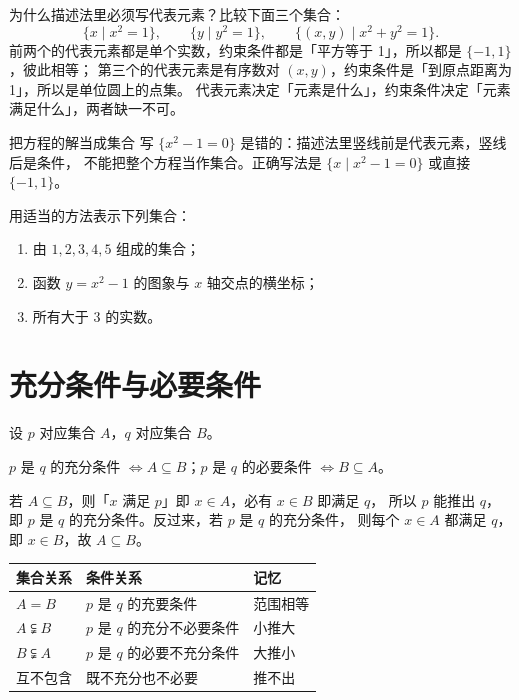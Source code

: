 \begin{derivation}
为什么描述法里必须写代表元素？比较下面三个集合：
\[
  \{x\mid x^2=1\},\qquad \{y\mid y^2=1\},\qquad \{(x,y)\mid x^2+y^2=1\}.
\]
前两个的代表元素都是单个实数，约束条件都是「平方等于 1」，所以都是 $\{-1,1\}$，彼此相等；
第三个的代表元素是有序数对 $(x,y)$，约束条件是「到原点距离为 1」，所以是单位圆上的点集。
代表元素决定「元素是什么」，约束条件决定「元素满足什么」，两者缺一不可。
\end{derivation}

\begin{commonerror}{把方程的解当成集合}
写 $\{x^2-1=0\}$ 是错的：描述法里竖线前是代表元素，竖线后是条件，
不能把整个方程当作集合。正确写法是 $\{x\mid x^2-1=0\}$ 或直接 $\{-1,1\}$。
\end{commonerror}

\begin{exercise}
用适当的方法表示下列集合：
\begin{enumerate}
  \item 由 $1,2,3,4,5$ 组成的集合；
  \item 函数 $y=x^2-1$ 的图象与 $x$ 轴交点的横坐标；
  \item 所有大于 $3$ 的实数。
\end{enumerate}
\end{exercise}

\section{充分条件与必要条件}

设 $p$ 对应集合 $A$，$q$ 对应集合 $B$。

\begin{theorem}
$p$ 是 $q$ 的充分条件 $\iff A\subseteq B$；$p$ 是 $q$ 的必要条件 $\iff B\subseteq A$。
\end{theorem}

\begin{derivation}
若 $A\subseteq B$，则「$x$ 满足 $p$」即 $x\in A$，必有 $x\in B$ 即满足 $q$，
所以 $p$ 能推出 $q$，即 $p$ 是 $q$ 的充分条件。反过来，若 $p$ 是 $q$ 的充分条件，
则每个 $x\in A$ 都满足 $q$，即 $x\in B$，故 $A\subseteq B$。
\end{derivation}

\begin{center}
\footnotesize
\setlength{\tabcolsep}{3pt}
\renewcommand{\arraystretch}{1.4}
\begin{tabular}{p{3.4cm}p{4.6cm}p{3.4cm}}
\toprule
集合关系 & 条件关系 & 记忆 \\
\midrule
$A=B$ & $p$ 是 $q$ 的充要条件 & 范围相等 \\
$A\subsetneqq B$ & $p$ 是 $q$ 的充分不必要条件 & 小推大 \\
$B\subsetneqq A$ & $p$ 是 $q$ 的必要不充分条件 & 大推小 \\
互不包含 & 既不充分也不必要 & 推不出 \\
\bottomrule
\end{tabular}
\end{center}

